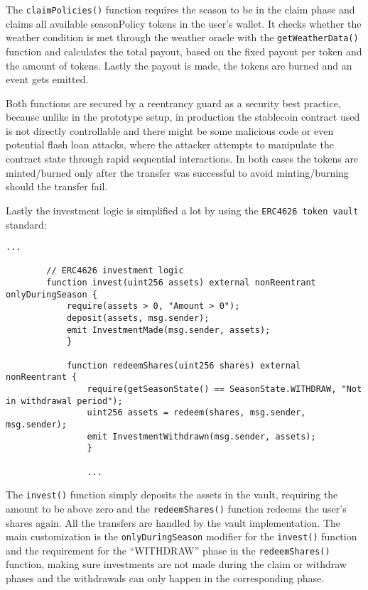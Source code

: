 \documentclass[11pt,a4paper]{article}
\begin{document}
		The \texttt{claimPolicies()} function requires the season to be in the claim phase and claims all available seasonPolicy tokens in the user's wallet.
		It checks whether the weather condition is met through the weather oracle with the \texttt{getWeatherData()} function and calculates the total payout, based on the fixed payout per token and the amount of tokens.
		Lastly the payout is made, the tokens are burned and an event gets emitted.

		Both functions are secured by a reentrancy guard as a security best practice, because unlike in the prototype setup, in production the stablecoin contract used is not directly controllable and there might be some malicious code or even potential flash loan attacks, where the attacker attempts to manipulate the contract state through rapid sequential interactions.
		In both cases the tokens are minted/burned only after the transfer was successful to avoid minting/burning should the transfer fail.

		Lastly the investment logic is simplified a lot by using the \texttt{ERC4626 token vault} standard:

		\begin{lstlisting}[style=soliditystyle, caption={RainyDayFund.sol - Main Insurance Contract},label={lst:contract-invest}]
		...

		// ERC4626 investment logic
		function invest(uint256 assets) external nonReentrant onlyDuringSeason {
			require(assets > 0, "Amount > 0");
			deposit(assets, msg.sender);
			emit InvestmentMade(msg.sender, assets);
			}

			function redeemShares(uint256 shares) external nonReentrant {
				require(getSeasonState() == SeasonState.WITHDRAW, "Not in withdrawal period");
				uint256 assets = redeem(shares, msg.sender, msg.sender);
				emit InvestmentWithdrawn(msg.sender, assets);
				}

				...
		\end{lstlisting}

		The \texttt{invest()} function simply deposits the assets in the vault, requiring the amount to be above zero and the \texttt{redeemShares()} function redeems the user's shares again.
		All the transfers are handled by the vault implementation.
		The main customization is the \texttt{onlyDuringSeason} modifier for the \texttt{invest()} function and the requirement for the \enquote{WITHDRAW} phase in the \texttt{redeemShares()} function, making sure investments are not made during the claim or withdraw phases and the withdrawals can only happen in the corresponding phase.
\end{document}
